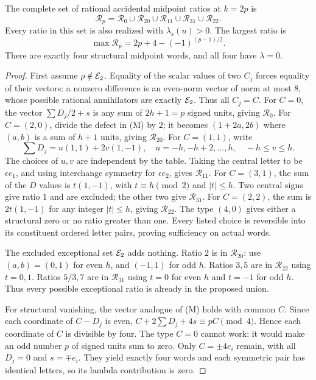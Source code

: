 \begin{theorem}\label{ext:thm:mid}
The complete set of rational accidental midpoint ratios at $k=2p$ is
\[
\mathcal R_p=\mathcal R_0\cup\mathcal R_{20}\cup\mathcal R_{11}\cup\mathcal R_{31}\cup\mathcal R_{22}.
\]
Every ratio in this set is also realized with $\lambda_s(u)>0$. The largest ratio is
\[
\max\mathcal R_p=2p+4-(-1)^{(p-1)/2}.
\]
There are exactly four structural midpoint words, and all four have $\lambda=0$.
\end{theorem}
\begin{proof}
First assume $\rho\notin\mathcal E_2$. Equality of the scalar values of two $C_j$ forces equality of their vectors: a nonzero difference is an even-norm vector of norm at most $8$, whose possible rational annihilators are exactly $\mathcal E_2$. Thus all $C_j=C$.
For $C=0$, the vector $\sum D_j/2+s$ is any sum of $2h+1=p$ signed units, giving $\mathcal R_0$. For $C=(2,0)$, divide the defect in (M) by $2$; it becomes $(1+2a,2b)$ where $(a,b)$ is a sum of $h+1$ units, giving $\mathcal R_{20}$. For $C=(1,1)$, write
\[
\sum D_j=u(1,1)+2v(1,-1),\quad u=-h,-h+2,\ldots,h,\quad -h\le v\le h.
\]
The choices of $u,v$ are independent by the table. Taking the central letter to be $\epsilon e_1$, and using interchange symmetry for $\epsilon e_2$, gives $\mathcal R_{11}$. For $C=(3,1)$, the sum of the $D$ values is $t(1,-1)$, with $t\equiv h\pmod2$ and $|t|\le h$. Two central signs give ratio $1$ and are excluded; the other two give $\mathcal R_{31}$. For $C=(2,2)$, the sum is $2t(1,-1)$ for any integer $|t|\le h$, giving $\mathcal R_{22}$. The type $(4,0)$ gives either a structural zero or no ratio greater than one. Every listed choice is reversible into its constituent ordered letter pairs, proving sufficiency on actual words.

The excluded exceptional set $\mathcal E_2$ adds nothing. Ratio $2$ is in $\mathcal R_{20}$: use $(a,b)=(0,1)$ for even $h$, and $(-1,1)$ for odd $h$. Ratios $3,5$ are in $\mathcal R_{22}$ using $t=0,1$. Ratios $5/3,7$ are in $\mathcal R_{31}$ using $t=0$ for even $h$ and $t=-1$ for odd $h$. Thus every possible exceptional ratio is already in the proposed union.

For structural vanishing, the vector analogue of (M) holds with common $C$. Since each coordinate of $C-D_j$ is even, $C+2\sum D_j+4s\equiv pC\pmod4$. Hence each coordinate of $C$ is divisible by four. The type $C=0$ cannot work: it would make an odd number $p$ of signed units sum to zero. Only $C=\pm4e_i$ remain, with all $D_j=0$ and $s=\mp e_i$. They yield exactly four words and each symmetric pair has identical letters, so its lambda contribution is zero.


\end{proof}
